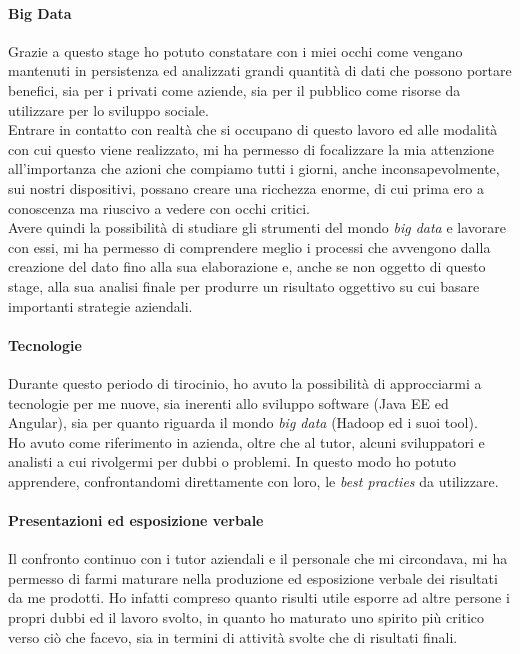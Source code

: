 \paragraph{Big Data}
Grazie a questo stage ho potuto constatare con i miei occhi come vengano mantenuti in persistenza ed analizzati grandi quantità di dati che possono portare benefici, sia per i privati come aziende, sia per il pubblico come risorse da utilizzare per lo sviluppo sociale. \\
Entrare in contatto con realtà che si occupano di questo lavoro ed alle modalità con cui questo viene realizzato, mi ha permesso di focalizzare la mia attenzione all'importanza che azioni che compiamo tutti i giorni, anche inconsapevolmente, sui nostri dispositivi, possano creare una ricchezza enorme, di cui prima ero a conoscenza ma riuscivo a vedere con occhi critici. \\
Avere quindi la possibilità di studiare gli strumenti del mondo \textit{big data} e lavorare con essi, mi ha permesso di comprendere meglio i processi che avvengono dalla creazione del dato fino alla sua elaborazione e, anche se non oggetto di questo stage, alla sua analisi finale per produrre un risultato oggettivo su cui basare importanti strategie aziendali.

\paragraph{Tecnologie}
Durante questo periodo di tirocinio, ho avuto la possibilità di approcciarmi a tecnologie per me nuove, sia inerenti allo sviluppo software (Java EE ed Angular), sia per quanto riguarda il mondo \textit{big data} (Hadoop ed i suoi tool). \\
Ho avuto come riferimento in azienda, oltre che al tutor, alcuni sviluppatori e analisti a cui rivolgermi per dubbi o problemi. In questo modo ho potuto apprendere, confrontandomi direttamente con loro, le \textit{best practies} da utilizzare.

\paragraph{Presentazioni ed esposizione verbale}
Il confronto continuo con i tutor aziendali e il personale che mi circondava, mi ha permesso di farmi maturare nella produzione ed esposizione verbale dei risultati da me prodotti. Ho infatti compreso quanto risulti utile esporre ad altre persone i propri dubbi ed il lavoro svolto, in quanto ho maturato uno spirito più critico verso ciò che facevo, sia in termini di attività svolte che di risultati finali.


